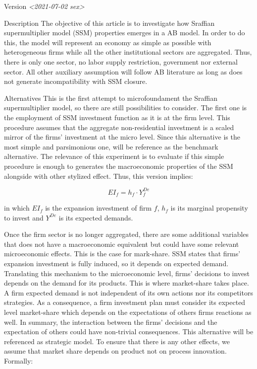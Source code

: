 \documentclass[presentation]{beamer}
\begin{document}
\begin{frame}[label={sec:org60efa21}]{Version \textit{<2021-07-02 sex>}}
\begin{block}{Description}
The objective of this article is to investigate how Sraffian supermultiplier model (SSM) properties emerges in a AB model.
In order to do this, the model will represent an economy as simple as possible with heterogeneous firms while all the other institutional sectors are aggregated.
Thus, there is only one sector, no labor supply restriction, government nor external sector.
All other auxiliary assumption will follow AB literature as long as does not generate incompatibility with SSM closure.
\end{block}


\begin{block}{Alternatives}
This is the first attempt to microfoundament the Sraffian supermultiplier model, so there are still possibilities to consider.
The first one is the employment of SSM investment function as it is at the firm level.
This procedure assumes that the aggregate non-residential investment is a scaled mirror of the firms' investment at the micro level.
Since this alternative is the most simple and parsimonious one, will be reference as the \alert{benchmark} alternative.
The relevance of this experiment is to evaluate if this simple procedure is enough to generates the macroeconomic properties of the SSM alongside with other stylized effect.
Thus, this version implies:

\begin{latex}
\begin{equation}
EI_{f} = h_{f}\cdot Y^{De}_{f}
\end{equation}
\end{latex}
in which \(EI_{f}\) is the expansion investment of firm \(f\), \(h_{f}\) is its marginal propensity to invest and \(Y^{De}\) is its expected demands.


Once the firm sector is no longer aggregated, there are some additional variables that does not have a macroeconomic equivalent but could have some relevant microeconomic effects.
This is the case for mark-share.
SSM states that firms' expansion investment is fully induced, so it depends on expected demand.
Translating this mechanism to the microeconomic level, firms' decisions to invest depends on the demand for its products.
This is where market-share takes place.
A firm expected demand is not independent of its own actions nor its competitors strategies.
As a consequence, a firm investment plan must consider its expected level market-share which depends on the expectations of others firms reactions as well.
In summary, the interaction between the firms' decisions and the expectation of others could have non-trivial consequences.
This alternative will be referenced as \alert{strategic model}.
To ensure that there is any other effects, we assume that market share depends on product not on process innovation.
Formally:


\end{block}
\end{frame}
\end{document}
